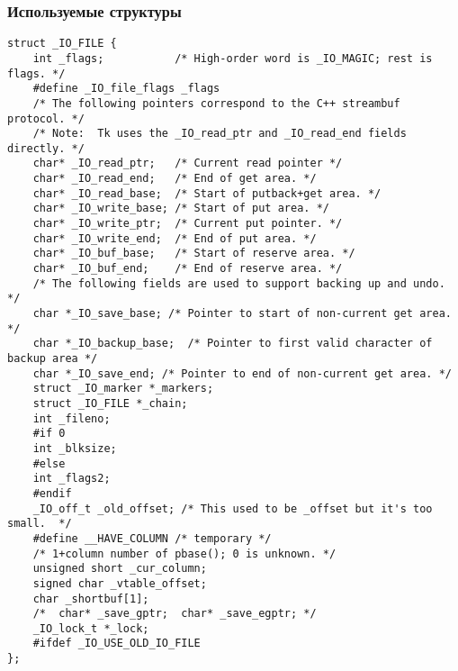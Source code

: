 \subsubsection*{\large Используемые структуры}
\begin{lstlisting}[caption=Структура \_IO\_FILE]
struct _IO_FILE {
	int _flags;           /* High-order word is _IO_MAGIC; rest is flags. */
	#define _IO_file_flags _flags
	/* The following pointers correspond to the C++ streambuf protocol. */
	/* Note:  Tk uses the _IO_read_ptr and _IO_read_end fields directly. */
	char* _IO_read_ptr;   /* Current read pointer */
	char* _IO_read_end;   /* End of get area. */
	char* _IO_read_base;  /* Start of putback+get area. */
	char* _IO_write_base; /* Start of put area. */
	char* _IO_write_ptr;  /* Current put pointer. */
	char* _IO_write_end;  /* End of put area. */
	char* _IO_buf_base;   /* Start of reserve area. */
	char* _IO_buf_end;    /* End of reserve area. */
	/* The following fields are used to support backing up and undo. */
	char *_IO_save_base; /* Pointer to start of non-current get area. */
	char *_IO_backup_base;  /* Pointer to first valid character of backup area */
	char *_IO_save_end; /* Pointer to end of non-current get area. */
	struct _IO_marker *_markers;
	struct _IO_FILE *_chain;
	int _fileno;
	#if 0
	int _blksize;
	#else
	int _flags2;
	#endif
	_IO_off_t _old_offset; /* This used to be _offset but it's too small.  */
	#define __HAVE_COLUMN /* temporary */
	/* 1+column number of pbase(); 0 is unknown. */
	unsigned short _cur_column;
	signed char _vtable_offset;
	char _shortbuf[1];
	/*  char* _save_gptr;  char* _save_egptr; */
	_IO_lock_t *_lock;
	#ifdef _IO_USE_OLD_IO_FILE
};
\end{lstlisting}


